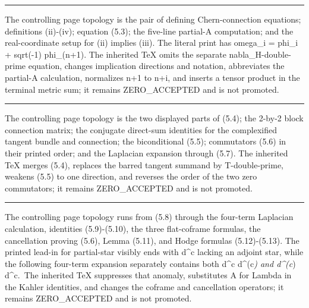 \documentclass[
  english,
  a3paper,
  a3paper]{extarticle}
\begin{document}
\vspace{0.7mm}\hrule\vspace{1.6mm}

\fontsize{11}{14}\selectfont

The controlling page topology is the pair of defining Chern-connection
equations; definitions (ii)-(iv); equation (5.3); the five-line
partial-A computation; and the real-coordinate setup for (ii) implies
(iii). The literal print has omega\_i = phi\_i + sqrt(-1) phi\_(n+1).
The inherited TeX omits the separate nabla\_H-double-prime equation,
changes implication directions and notation, abbreviates the partial-A
calculation, normalizes n+1 to n+i, and inserts a tensor product in the
terminal metric sum; it remains ZERO\_ACCEPTED and is not promoted.

\clearpage



\par

\vspace{0.7mm}\hrule\vspace{1.6mm}

\fontsize{11}{14}\selectfont

The controlling page topology is the two displayed parts of (5.4); the
2-by-2 block connection matrix; the conjugate direct-sum identities for
the complexified tangent bundle and connection; the biconditional (5.5);
commutators (5.6) in their printed order; and the Laplacian expansion
through (5.7). The inherited TeX merges (5.4), replaces the barred
tangent summand by T-double-prime, weakens (5.5) to one direction, and
reverses the order of the two zero commutators; it remains
ZERO\_ACCEPTED and is not promoted.

\clearpage



\par

\vspace{0.7mm}\hrule\vspace{1.6mm}

\fontsize{11}{14}\selectfont

The controlling page topology runs from (5.8) through the four-term
Laplacian calculation, identities (5.9)-(5.10), the three flat-coframe
formulas, the cancellation proving (5.6), Lemma (5.11), and Hodge
formulas (5.12)-(5.13). The printed lead-in for partial-star visibly
ends with d\^{}c lacking an adjoint star, while the following four-term
expansion separately contains both d\^{}c d\^{}(c\emph{) and d\^{}(c})
d\^{}c.~The inherited TeX suppresses that anomaly, substitutes A for
Lambda in the Kahler identities, and changes the coframe and
cancellation operators; it remains ZERO\_ACCEPTED and is not promoted.
\end{document}
